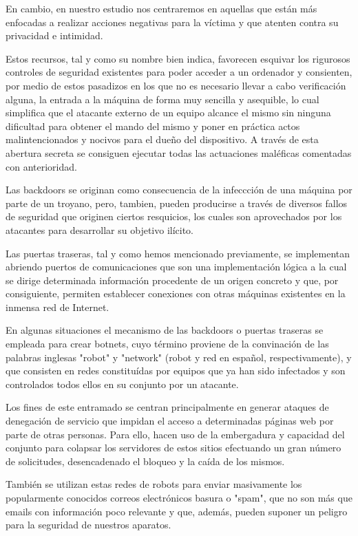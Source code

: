 En cambio, en nuestro estudio nos centraremos en aquellas que están más enfocadas a realizar acciones negativas para la víctima y que atenten contra su privacidad e intimidad.

Estos recursos, tal y como su nombre bien indica, favorecen esquivar los rigurosos controles de seguridad existentes para poder acceder a un ordenador y consienten, por medio de estos pasadizos en los que no es necesario llevar a cabo verificación alguna, la entrada a la máquina de forma muy sencilla y asequible, lo cual simplifica que el atacante externo de un equipo alcance el mismo sin ninguna dificultad para obtener el mando del mismo y poner en práctica actos malintencionados y nocivos para el dueño del dispositivo. A través de esta abertura secreta se consiguen ejecutar todas las actuaciones maléficas comentadas con anterioridad.

Las backdoors se originan como consecuencia de la infeccción de una máquina por parte de un troyano, pero, tambien, pueden producirse a través de diversos fallos de seguridad que originen ciertos resquicios, los cuales son aprovechados por los atacantes para desarrollar su objetivo ilícito.

Las puertas traseras, tal y como hemos mencionado previamente, se implementan abriendo puertos de comunicaciones que son una implementación lógica a la cual se dirige determinada información procedente de un origen concreto y que, por consiguiente, permiten establecer conexiones con otras máquinas existentes en la inmensa red de Internet.

En algunas situaciones el mecanismo de las backdoors o puertas traseras se empleada para crear botnets, cuyo término proviene de la convinación de las palabras inglesas "robot" y "network" (robot y red en español, respectivamente), y que consisten en redes constituídas por equipos que ya han sido infectados y son controlados todos ellos en su conjunto por un atacante.

Los fines de este entramado se centran principalmente en generar ataques de denegación de servicio que impidan el acceso a determinadas páginas web por parte de otras personas. Para ello, hacen uso de la embergadura y capacidad del conjunto para colapsar los servidores de estos sitios efectuando un gran número de solicitudes, desencadenado el bloqueo y la caída de los mismos.

También se utilizan estas redes de robots para enviar masivamente los popularmente conocidos correos electrónicos basura o "spam", que no son más que emails con información poco relevante y que, además, pueden suponer un peligro para la seguridad de nuestros aparatos.

